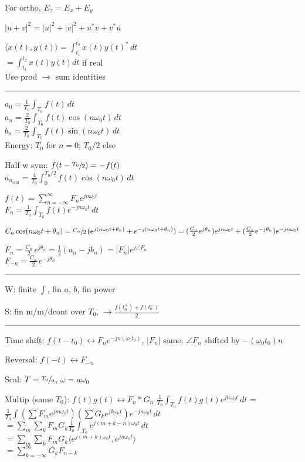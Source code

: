 \documentclass[4pt]{article}
\theoremstyle{definition}
\theoremstyle{definition}
\begin{document}
\begin{multicols}{3}
    For ortho, $E_z = E_x + E_y$
        

    $|u+v|^2 = |u|^2 + |v|^2 + u^*v + v^*u$

    $\langle x(t), y(t)\rangle = \int_{t_1}^{t_2} x(t) y(t)^* \, dt$\\
    \( = \int_{t_1}^{t_2} x(t) y(t) dt\) if real\\
    Use prod $\rightarrow$ sum identities
\rule{\linewidth}{0.5pt}
    $a_0 = \frac{1}{T_0} \int_{T_0} f(t)\, dt$\\
    $a_n = \frac{2}{T_0} \int_{T_0} f(t) \cos(n\omega_0t)\,dt$\\
    $b_n = \frac{2}{T_0} \int_{T_0} f(t) \sin(n\omega_0t)\,dt$\\
    Energy: $T_0$ for $n=0$; $T_0/2$ else
     
    Half-w sym: $f(t - \sfrac{T_0}{2}) = -f(t)$\\
    $a_{n_\mathrm{odd}} = \frac{4}{T_0}\int_{0}^{T_0/2} f(t) \cos (n\omega_0 t) \, dt$

    $f(t) = \sum_{n=-\infty}^{\infty} F_n e^{jn\omega_0 t}$\\
    $F_n = \frac{1}{T_0}\int_{T_0} f(t) e^{-jn\omega_0t}\,dt$

    $C_n\cos(n\omega_0 t + \theta_n) = \sfrac{C_n}{2} \, (e^{j(n\omega_0t + \theta_n)} + e^{-j(n\omega_0 t + \theta_n)}) = (\frac{C_n} 2 e^{j\theta_n}) e^{jn\omega_0 t} + (\frac{C_n} 2 e^{-j\theta_n}) e^{-jn\omega_0 t}$

    $F_n = \frac{C_n}{2}\, e^{j\theta_n} = \frac 1 2 (a_n - jb_n) = |F_n| e^{j\angle F_n}$\\
    $F_{-n} = \frac{C_n}{2}\, e^{-j\theta_n}$
\rule{\linewidth}{0.5pt}
    W: finite $\int$, fin $a$, $b$, fin power

    S: fin m/m/dcont over $T_0$, $\rightarrow \frac{f(t_0^+) + f(t_0^-)}{2}$
\rule{\linewidth}{0.5pt}
    Time shift: $f(t-t_0)\leftrightarrow F_n e^{-jn(\omega_0 t_0)}$, $|F_n|$ same, $\angle F_n$ shifted by $-(\omega_0 t_0)n$

    Reversal: $f(-t)\leftrightarrow F_{-n}$

    Scal: $T = \sfrac {T_0} a$, $\omega = a\omega_0$

    Multip (same $T_0$): $f(t) g(t) \leftrightarrow F_n * G_n$ 
        $\frac 1{T_0}  \int_{T_0} f(t) g(t) e^{jn\omega_0 t}\, dt$ =\\
        $ \frac{1}{T_0} \int (\sum F_m e^{jm\omega_0 t}) (\sum G_k e^{jk\omega_0 t}) e^{-jn\omega_0 t} \, dt$ \\
        $ = \sum_m \sum_k F_m G_k \frac{1}{T_0} \int_{T_0} e^{j(m+k-n)\omega_0 t} \, dt$\\
        $ = \sum_m \sum_k F_m G_k \langle e^{j(m+k)\omega_0 t}, e^{jn\omega_0 t}\rangle$\\
        $ = \sum_{k=-\infty}^{\infty} G_k F_{n-k}$
        

\end{multicols}
\end{document}
